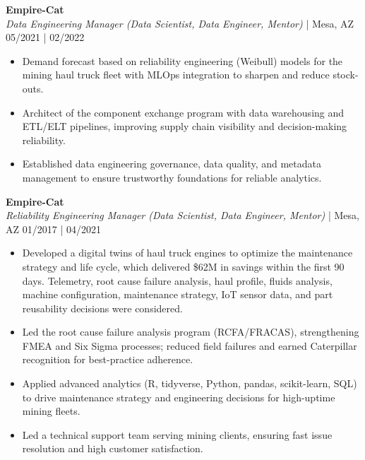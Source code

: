 \documentclass[10pt, letterpaper, sans]{article}
\begin{document}

\textbf{Empire-Cat} \\
\textit{Data Engineering Manager (Data Scientist, Data Engineer, Mentor)} | Mesa, AZ \hfill 05/2021 | 02/2022
\begin{itemize}
  
    \item Demand forecast based on reliability engineering (Weibull) models for the mining haul truck fleet with MLOps integration to sharpen and reduce stock-outs.
    
    \item Architect of the component exchange program with data warehousing and ETL/ELT pipelines, improving supply chain visibility and decision-making reliability.
    
    \item Established data engineering governance, data quality, and metadata management to ensure trustworthy foundations for reliable analytics.

\end{itemize}

\textbf{Empire-Cat} \\
\textit{Reliability Engineering Manager (Data Scientist, Data Engineer, Mentor)} | Mesa, AZ \hfill 01/2017 | 04/2021

\begin{itemize}
  
    \item Developed a digital twins of haul truck engines to optimize the maintenance strategy and life cycle, which delivered \$62M in savings within the first 90 days. Telemetry, root cause failure analysis, haul profile, fluids analysis, machine configuration, maintenance strategy, IoT sensor data, and part reusability decisions were considered. 
    
    \item Led the root cause failure analysis program (RCFA/FRACAS), strengthening FMEA and Six Sigma processes; reduced field failures and earned Caterpillar recognition for best-practice adherence.
    
    \item Applied advanced analytics (R, tidyverse, Python, pandas, scikit-learn, SQL) to drive maintenance strategy and engineering decisions for high-uptime mining fleets.
    
    \item Led a technical support team serving mining clients, ensuring fast issue resolution and high customer satisfaction.

\end{itemize}
\end{document}
